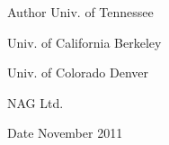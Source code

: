 \begin{DoxyAuthor}{Author}
Univ. of Tennessee 

Univ. of California Berkeley 

Univ. of Colorado Denver 

N\+A\+G Ltd. 
\end{DoxyAuthor}
\begin{DoxyDate}{Date}
November 2011 
\end{DoxyDate}

